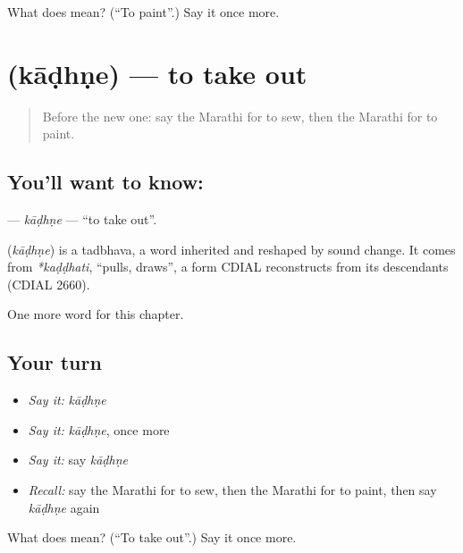 \begin{tcolorbox}[breakable,colback=teal!4,colframe=teal!35!black,title={Before you move on}]
What does  mean? (\textquotedblleft{}To paint\textquotedblright{}.) Say it once more.
\end{tcolorbox}
\section[\texorpdfstring{\mr{काढणे} (kāḍhṇe)}{काढणे (kāḍhṇe)}]{ (kāḍhṇe) — to take out}

\label{lesson:MR-C155-kadhne}



\begin{quote}
Before the new one: say the Marathi for to sew, then the Marathi for to paint.
\end{quote}

\subsection*{You'll want to know: }
\textbf{} — \emph{kāḍhṇe} — \textquotedblleft{}to take out\textquotedblright{}.

\begin{cousinweb}
\textbf{} (\emph{kāḍhṇe}) is a tadbhava, a word inherited and reshaped by sound change. It comes from \emph{*kaḍḍhati}, \textquotedblleft{}pulls, draws\textquotedblright{}, a form CDIAL reconstructs from its descendants (CDIAL 2660).
\end{cousinweb}

\begin{grammarlens}[title={What you've built}]
One more word for this chapter.
\end{grammarlens}

\subsection*{Your turn}
\begin{itemize}
\raggedright
  \item \emph{Say it:} \emph{kāḍhṇe}
  \item \emph{Say it:} \emph{kāḍhṇe}, once more
  \item \emph{Say it:} say \emph{kāḍhṇe}
  \item \emph{Recall:} say the Marathi for to sew, then the Marathi for to paint, then say \emph{kāḍhṇe} again
\end{itemize}

\begin{tcolorbox}[breakable,colback=teal!4,colframe=teal!35!black,title={Before you move on}]
What does  mean? (\textquotedblleft{}To take out\textquotedblright{}.) Say it once more.
\end{tcolorbox}
